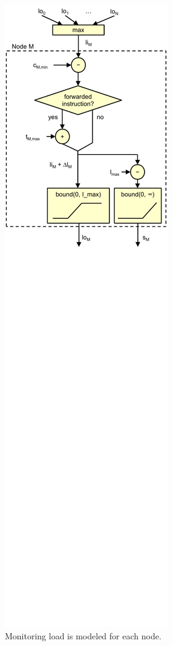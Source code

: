 \begin{figure}
  \begin{center}
    \includegraphics{monitoring_wcet/figs/monitoring_load_detailed.pdf}
    \caption{Monitoring load is modeled for each node.}
    \label{fig:monitoring_wcet.wcet.monitoring_load_detailed}
  \end{center}
\end{figure}

